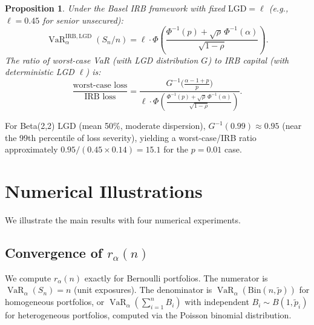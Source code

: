 \documentclass[11pt]{article}
\newtheorem{proposition}[theorem]{Proposition}
\theoremstyle{definition}
\newcommand{\VaR}{\operatorname{VaR}}
\newcommand{\1}{\mathbf{1}}
\begin{document}
\begin{proposition}\label{prop:lgd_capital}
Under the Basel IRB framework with fixed $\mathrm{LGD} = \ell$ (e.g., $\ell = 0.45$ for senior unsecured):
\begin{equation}\label{eq:irb_lgd}
  \VaR_\alpha^{\mathrm{IRB, LGD}}(S_n/n) = \ell \cdot \Phi\!\left(\frac{\Phi^{-1}(p) + \sqrt{\rho}\,\Phi^{-1}(\alpha)}{\sqrt{1-\rho}}\right).
\end{equation}
The ratio of worst-case VaR (with LGD distribution $G$) to IRB capital (with deterministic LGD $\ell$) is:
\begin{equation}\label{eq:irb_lgd_ratio}
  \frac{\text{worst-case loss}}{\text{IRB loss}} = \frac{G^{-1}\!\bigl(\frac{\alpha-1+p}{p}\bigr)}{\ell \cdot \Phi\!\left(\frac{\Phi^{-1}(p)+\sqrt{\rho}\,\Phi^{-1}(\alpha)}{\sqrt{1-\rho}}\right)}.
\end{equation}
\end{proposition}

For Beta(2,2) LGD (mean 50\%, moderate dispersion), $G^{-1}(0.99) \approx 0.95$ (near the 99th percentile of loss severity), yielding a worst-case/IRB ratio approximately $0.95/(0.45 \times 0.14) = 15.1$ for the $p = 0.01$ case.

\section{Numerical Illustrations}\label{sec:numerics}

We illustrate the main results with four numerical experiments.

\subsection{Convergence of $r_\alpha(n)$}

We compute $r_\alpha(n)$ exactly for Bernoulli portfolios. The numerator is $\VaR_\alpha(S_n) = n$ (unit exposures). The denominator is $\VaR_\alpha(\mathrm{Bin}(n, \tilde{p}))$ for homogeneous portfolios, or $\VaR_\alpha(\sum_{i=1}^n B_i)$ with independent $B_i \sim B(1, \tilde{p}_i)$ for heterogeneous portfolios, computed via the Poisson binomial distribution.
\end{document}
